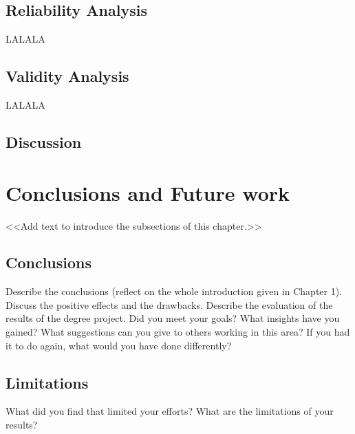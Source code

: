 \documentclass[a4paper,10pt,twocolumn]{article}
\numberwithin{figure}{section}
\numberwithin{table}{section}
\begin{document}


\subsection{Reliability Analysis}
LALALA

\subsection{Validity Analysis}
LALALA


\subsection{Discussion}





\section{Conclusions and Future work}
<<Add text to introduce the subsections of this chapter.>>

\subsection{Conclusions}
Describe the conclusions (reflect on the whole introduction given in Chapter 1).
Discuss the positive effects and the drawbacks.
Describe the evaluation of the results of the degree project.
Did you meet your goals?
What insights have you gained?
What suggestions can you give to others working in this area?
If you had it to do again, what would you have done differently?

\subsection{Limitations}
What did you find that limited your efforts? What are the limitations of your results?
\end{document}
